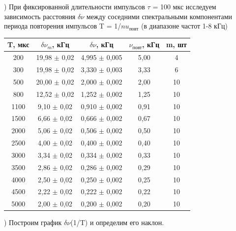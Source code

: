 \documentclass[a4paper,12pt]{article}
\begin{document}
) При фиксированной длительности импульсов $\tau$ = 100 мкс исследуем зависимость расстояния $\delta\nu$ между соседними спектральными компонентами периода повторения импульсов T = 1/$nu_{\text{повт}}$ (в диапазоне частот 1-8 кГц)

\begin{center}
\begin{tabular}{|c|c|c|c|c|}
	\hline
	T, мкс & $\delta\nu_m$, кГц & $\delta\nu$, кГц & $\nu_{\text{повт}}$, кГц & m, шт \\
	\hline
	200 & 19,98 $\pm$ 0,02 & 4,995 $\pm$ 0,005 & 5,00 & 4 \\
	\hline
	300 & 19,98 $\pm$ 0,02 & 3,330 $\pm$ 0,003  & 3,33 & 6 \\
	\hline
	500 & 20,00 $\pm$ 0,02 & 2,000 $\pm$ 0,002 & 2,00 & 10 \\
	\hline
	800 & 12,52 $\pm$ 0,02 & 1,252 $\pm$ 0,002  & 1,25 & 10 \\
	\hline
	1100 & 9,10 $\pm$ 0,02 & 0,910 $\pm$ 0,002  & 0,91 & 10 \\
	\hline
	1500 & 6,66 $\pm$ 0,02  & 0,666 $\pm$ 0,002   & 0,67 & 10 \\
	\hline
	2000 & 5,06 $\pm$ 0,02  & 0,506 $\pm$ 0,002  & 0,50 & 10 \\
	\hline
	2500 & 4,00 $\pm$ 0,02  & 0,400 $\pm$ 0,002   & 0,40 & 10 \\
	\hline
	3000 & 3,34 $\pm$ 0,02  & 0,334 $\pm$ 0,002  & 0,33 & 10 \\
	\hline
	3500 & 2,86 $\pm$ 0,02  & 0,286 $\pm$ 0,002  & 0,29 & 10 \\
	\hline
	4000 & 2,50 $\pm$ 0,02  & 0,250 $\pm$ 0,002  & 0,25 & 10 \\
	\hline
	4500 & 2,22 $\pm$ 0,02  & 0,222 $\pm$ 0,002  & 0,22 & 10 \\
	\hline
	5000 & 2,00 $\pm$ 0,02  & 0,200 $\pm$ 0,002  & 0,20 & 10 \\
	\hline
\end{tabular}
\end{center}

) Построим график $\delta\nu$(1/T) и определим его наклон.

\end{document}
